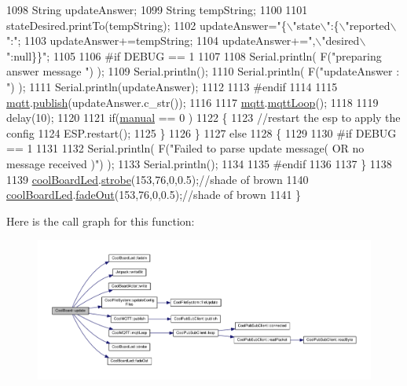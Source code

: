 \begin{DoxyCode}
1098             String updateAnswer;
1099             String tempString;
1100             
1101             stateDesired.printTo(tempString);
1102             updateAnswer=\textcolor{stringliteral}{"\{\(\backslash\)"state\(\backslash\)":\{\(\backslash\)"reported\(\backslash\)":"};
1103             updateAnswer+=tempString;
1104             updateAnswer+=\textcolor{stringliteral}{",\(\backslash\)"desired\(\backslash\)":null\}\}"};
1105 
1106 \textcolor{preprocessor}{        #if DEBUG == 1}
1107 
1108             Serial.println( F(\textcolor{stringliteral}{"preparing answer message "}) );
1109             Serial.println();
1110             Serial.println( F(\textcolor{stringliteral}{"updateAnswer : "}) );
1111             Serial.println(updateAnswer);
1112         
1113 \textcolor{preprocessor}{        #endif  }
1114 
1115             \hyperlink{class_cool_board_a2399f44d7c23c1149a335cb3b46d90f1}{mqtt}.\hyperlink{class_cool_m_q_t_t_ace977b3e90ab14b1199fe5c4fb0a13ec}{publish}(updateAnswer.c\_str());
1116             
1117             \hyperlink{class_cool_board_a2399f44d7c23c1149a335cb3b46d90f1}{mqtt}.\hyperlink{class_cool_m_q_t_t_aa5eaae967b562b62cbcf2b8d81f6e5d5}{mqttLoop}();
1118 
1119             delay(10);
1120         
1121             \textcolor{keywordflow}{if}(\hyperlink{class_cool_board_a7c8e505a5804b109e112d5a03df6ea2b}{manual} == 0 )
1122             \{
1123                 \textcolor{comment}{//restart the esp to apply the config}
1124                 ESP.restart();
1125             \}
1126     \}
1127     \textcolor{keywordflow}{else}
1128     \{
1129     
1130 \textcolor{preprocessor}{    #if DEBUG == 1}
1131 
1132         Serial.println( F(\textcolor{stringliteral}{"Failed to parse update message( OR no message received )"}) );
1133         Serial.println();
1134     
1135 \textcolor{preprocessor}{    #endif}
1136     
1137     \}
1138 
1139     \hyperlink{class_cool_board_a1b1d3c684a5baa56b08486e192fd8e97}{coolBoardLed}.\hyperlink{class_cool_board_led_ad5f0de4c628cbfbf49896042831c64ad}{strobe}(153,76,0,0.5);\textcolor{comment}{//shade of brown}
1140     \hyperlink{class_cool_board_a1b1d3c684a5baa56b08486e192fd8e97}{coolBoardLed}.\hyperlink{class_cool_board_led_a93d545679237e8cc858324367149775c}{fadeOut}(153,76,0,0.5);\textcolor{comment}{//shade of brown                              }
1141 \}
\end{DoxyCode}
Here is the call graph for this function\+:\nopagebreak
\begin{figure}[H]
\begin{center}
\leavevmode
\includegraphics[width=350pt]{d7/df9/class_cool_board_a8612756d3f73198cdde857a66f0fe690_cgraph}
\end{center}
\end{figure}
